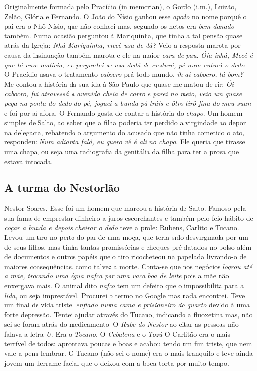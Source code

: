 \documentclass[12pt,brazil,]{book}
\begin{document}
Originalmente formada pelo Pracídio (in memorian), o Gordo (i.m.),
Luizão, Zelão, Glória e Fernando. O João do Nísio ganhou esse
\emph{apodo} no nome porquê o pai era o Nhô Nísio, que não conheci mas,
segundo os netos era \emph{bem danado} também. Numa ocasião perguntou à
Mariquinha, que tinha a tal pensão quase atrás da Igreja: \emph{Nhá
Mariquinha, mecê usa de dá?} Veio a resposta marota por causa da
insinuação também marota e ele na maior \emph{cara de pau}. \emph{Óia
inhá, Mecê é que tá cum malícia, eu perguntei se usa dedá de custurá, pá
num cutucá o dedo}. O Pracídio usava o tratamento \emph{cabocro} prá
todo mundo. \emph{ih aí cabocro, tá bom?} Me contou a história da sua
ida à São Paulo que quase me matou de rir: \emph{Ói cabocro, fui
atravessá a avenida cheia de carro e parei no meio, veio um quase pega
na ponta do dedo do pé, joguei a bunda pá tráis e ôtro tirô fina do meu
suan} e foi por aí afora. O Fernando gosta de contar a história do
\emph{chapo}. Um homem simples de Salto, ao saber que a filha poderia
ter perdido a virgindade ao depor na delegacia, rebatendo o argumento do
acusado que não tinha cometido o ato, respondeu: \emph{Num adianta falá,
eu quero vê é ali no chapo}. Ele queria que tirasse uma chapa, ou seja
uma radiografia da genitália da filha para ter a prova que estava
intocada.

\subsection{A turma do Nestorlão}\label{a-turma-do-nestorluxe3o}

Nestor Soares. Esse foi um homem que marcou a história de Salto. Famoso
pela sua fama de emprestar dinheiro a juros escorchantes e também pelo
feio hábito de \emph{coçar a bunda e depois cheirar o dedo} teve a
prole: Rubens, Carlito e Tucano. Levou um tiro no peito do pai de uma
moça, que teria sido desvirginada por um de seus filhos, mas tinha
tantas promissórias e cheques pré datados no bolso além de documentos e
outros papéis que o tiro ricocheteou na papelada livrando-o de maiores
consequências, como talvez a morte. Conta-se que nos negócios
\emph{logrou até a mãe, trocando uma égua nafca por uma vaca boa de
leite} pois a mãe não enxergava mais. O animal dito \emph{nafco} tem um
defeito que o impossibilita para a \emph{lida}, ou seja imprestável.
Procurei o termo no Google mas nada encontrei. Teve um final de vida
triste, \emph{enfiado numa cama e prisioneiro do quarto} devido à uma
forte depressão. Tentei ajudar através do Tucano, indicando a fluoxetina
mas, não sei se foram atrás do medicamento. O \emph{Rube do Nestor} ao
citar as pessoas não falava a letra \emph{U}. Era o \emph{Tocano}. O
\emph{Cebalena} e o \emph{Tozú} O Carlitão era o mais terrível de todos:
aprontava poucas e boas e acabou tendo um fim triste, que nem vale a
pena lembrar. O Tucano (não sei o nome) era o mais tranquilo e teve
ainda jovem um derrame facial que o deixou com a boca torta por muito
tempo.
\end{document}
